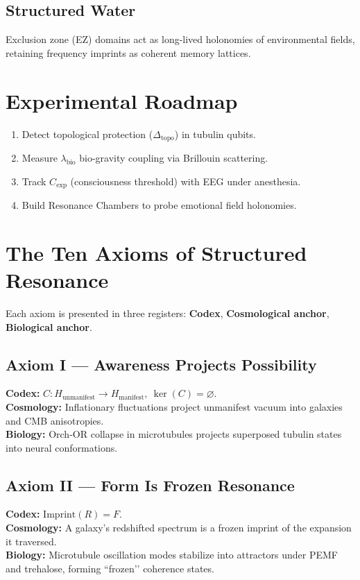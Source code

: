 \documentclass[11pt]{article}
\begin{document}
\subsection{Structured Water}
Exclusion zone (EZ) domains act as long-lived holonomies of environmental fields,
retaining frequency imprints as coherent memory lattices.

\section{Experimental Roadmap}
\begin{enumerate}
    \item Detect topological protection ($\Delta_{\text{topo}}$) in tubulin qubits.
    \item Measure $\lambda_{\text{bio}}$ bio-gravity coupling via Brillouin scattering.
    \item Track $C_{\text{exp}}$ (consciousness threshold) with EEG under anesthesia.
    \item Build Resonance Chambers to probe emotional field holonomies.
\end{enumerate}

\section{The Ten Axioms of Structured Resonance}
Each axiom is presented in three registers: \textbf{Codex}, \textbf{Cosmological anchor}, \textbf{Biological anchor}.

\subsection*{Axiom I --- Awareness Projects Possibility}
\textbf{Codex:} $C : H_{\text{unmanifest}} \to H_{\text{manifest}}, \ \ker(C)=\varnothing$. \\
\textbf{Cosmology:} Inflationary fluctuations project unmanifest vacuum into galaxies and CMB anisotropies. \\
\textbf{Biology:} Orch-OR collapse in microtubules projects superposed tubulin states into neural conformations. \\

\subsection*{Axiom II --- Form Is Frozen Resonance}
\textbf{Codex:} $\mathrm{Imprint}(R)=F$. \\
\textbf{Cosmology:} A galaxy’s redshifted spectrum is a frozen imprint of the expansion it traversed. \\
\textbf{Biology:} Microtubule oscillation modes stabilize into attractors under PEMF and trehalose, forming ``frozen’’ coherence states. \\
\end{document}
